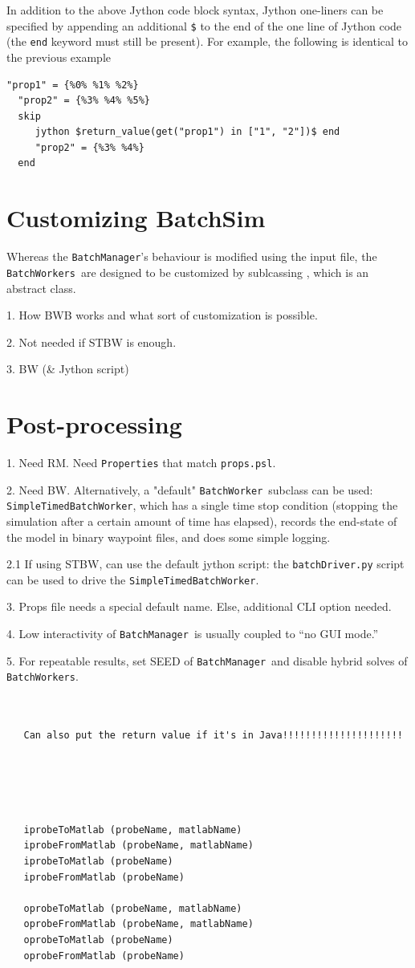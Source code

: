 \documentclass{article}
\newcommand{\BM}{{\tt BatchManager}}
\newcommand{\BW}{{\tt BatchWorker}}
\newcommand{\BWs}{{\tt BatchWorkers}}
\begin{document}
In addition to the above Jython code block syntax, Jython one-liners can be specified by appending an additional {\tt \$} to the end of the one line of Jython code (the {\tt end} keyword must still be present). For example, the following is identical to the previous example

\begin{lstlisting}[]
  "prop1" = {%0% %1% %2%}
  "prop2" = {%3% %4% %5%}
  skip
     jython $return_value(get("prop1") in ["1", "2"])$ end
     "prop2" = {%3% %4%}
  end
\end{lstlisting}

\section{Customizing BatchSim}
\label{custom}

Whereas the \BM's behaviour is modified using the input file, the \BWs\ are designed to be customized by sublcassing , which is an abstract class.

1. How BWB works and what sort of customization is possible.

2. Not needed if STBW is enough.

3. BW (\& Jython script)

\section{Post-processing}

1. Need RM. Need {\tt Properties} that match {\tt props.psl}.

2. Need BW.  Alternatively, a "default" \BW\ subclass can be used: {\tt SimpleTimedBatchWorker}, which has a single time stop condition (stopping the simulation after a certain amount of time has elapsed), records the end-state of the model in binary waypoint files, and does some simple logging.

2.1 If using STBW, can use the default jython script: the {\tt batchDriver.py} script can be used to drive the {\tt SimpleTimedBatchWorker}.

3. Props file needs a special default name. Else, additional CLI option needed.

4. Low interactivity of \BM\ is usually coupled to ``no GUI mode.''

5. For repeatable results, set SEED of \BM\ and disable hybrid solves of \BWs.

\begin{lstlisting}[]


   Can also put the return value if it's in Java!!!!!!!!!!!!!!!!!!!!!
   
   
   
   

   iprobeToMatlab (probeName, matlabName)
   iprobeFromMatlab (probeName, matlabName)
   iprobeToMatlab (probeName)
   iprobeFromMatlab (probeName)

   oprobeToMatlab (probeName, matlabName)
   oprobeFromMatlab (probeName, matlabName)
   oprobeToMatlab (probeName)
   oprobeFromMatlab (probeName)
\end{lstlisting}
\end{document}
